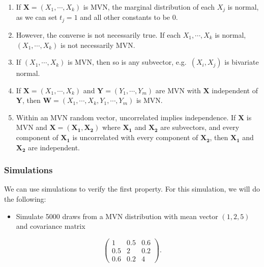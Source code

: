 \documentclass[
]{book}
\providecommand{\tightlist}{%
  \setlength{\itemsep}{0pt}\setlength{\parskip}{0pt}}
\begin{document}
\begin{enumerate}
\def\labelenumi{\arabic{enumi}.}
\item
  If \(\boldsymbol{X} = (X_1, \cdots, X_k)\) is MVN, the marginal distribution of each \(X_j\) is normal, as we can set \(t_j =1\) and all other constants to be 0.
\item
  However, the converse is not necessarily true. If each \(X_1, \cdots, X_k\) is normal, \((X_1, \cdots, X_k)\) is not necessarily MVN.
\item
  If \((X_1, \cdots, X_k)\) is MVN, then so is any subvector, e.g.~\((X_i, X_j)\) is bivariate normal.
\item
  If \(\boldsymbol{X} = (X_1, \cdots, X_k)\) and \(\boldsymbol{Y} = (Y_1, \cdots, Y_m)\) are MVN with \(\boldsymbol{X}\) independent of \(\boldsymbol{Y}\), then \(\boldsymbol{W} = (X_1, \cdots, X_k, Y_1, \cdots, Y_m)\) is MVN.
\item
  Within an MVN random vector, uncorrelated implies independence. If \(\boldsymbol{X}\) is MVN and \(\boldsymbol{X} = (\boldsymbol{X_1, X_2})\) where \(\boldsymbol{X_1}\) and \(\boldsymbol{X_2}\) are subvectors, and every component of \(\boldsymbol{X_1}\) is uncorrelated with every component of \(\boldsymbol{X_2}\), then \(\boldsymbol{X_1}\) and \(\boldsymbol{X_2}\) are independent.
\end{enumerate}

\subsubsection{Simulations}\label{simulations}

We can use simulations to verify the first property. For this simulation, we will do the following:

\begin{itemize}
\tightlist
\item
  Simulate 5000 draws from a MVN distribution with mean vector \((1,2,5)\) and covariance matrix
\end{itemize}

\[
\begin{pmatrix}
1 & 0.5 & 0.6\\
0.5 & 2 & 0.2 \\
0.6 & 0.2 & 4
\end{pmatrix}.
\]
\end{document}
